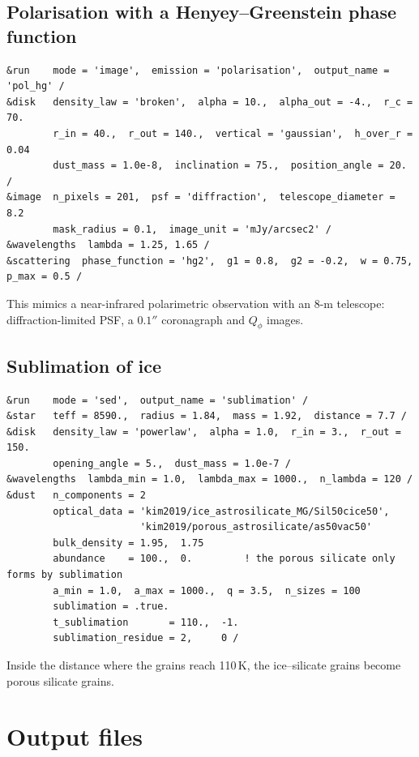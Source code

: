 \documentclass[11pt,a4paper]{article}
\begin{document}
\subsection{Polarisation with a Henyey--Greenstein phase function}

\begin{lstlisting}[style=nml]
&run    mode = 'image',  emission = 'polarisation',  output_name = 'pol_hg' /
&disk   density_law = 'broken',  alpha = 10.,  alpha_out = -4.,  r_c = 70.
        r_in = 40.,  r_out = 140.,  vertical = 'gaussian',  h_over_r = 0.04
        dust_mass = 1.0e-8,  inclination = 75.,  position_angle = 20. /
&image  n_pixels = 201,  psf = 'diffraction',  telescope_diameter = 8.2
        mask_radius = 0.1,  image_unit = 'mJy/arcsec2' /
&wavelengths  lambda = 1.25, 1.65 /
&scattering  phase_function = 'hg2',  g1 = 0.8,  g2 = -0.2,  w = 0.75,  p_max = 0.5 /
\end{lstlisting}
This mimics a near-infrared polarimetric observation with an 8-m telescope: diffraction-limited
PSF, a $0.1''$ coronagraph and $Q_\phi$ images.

\subsection{Sublimation of ice}

\begin{lstlisting}[style=nml]
&run    mode = 'sed',  output_name = 'sublimation' /
&star   teff = 8590.,  radius = 1.84,  mass = 1.92,  distance = 7.7 /
&disk   density_law = 'powerlaw',  alpha = 1.0,  r_in = 3.,  r_out = 150.
        opening_angle = 5.,  dust_mass = 1.0e-7 /
&wavelengths  lambda_min = 1.0,  lambda_max = 1000.,  n_lambda = 120 /
&dust   n_components = 2
        optical_data = 'kim2019/ice_astrosilicate_MG/Sil50cice50',
                       'kim2019/porous_astrosilicate/as50vac50'
        bulk_density = 1.95,  1.75
        abundance    = 100.,  0.         ! the porous silicate only forms by sublimation
        a_min = 1.0,  a_max = 1000.,  q = 3.5,  n_sizes = 100
        sublimation = .true.
        t_sublimation       = 110.,  -1.
        sublimation_residue = 2,     0 /
\end{lstlisting}
Inside the distance where the grains reach 110\,K, the ice--silicate grains become porous
silicate grains.

\section{Output files}
\label{sec:outputs}
\end{document}
